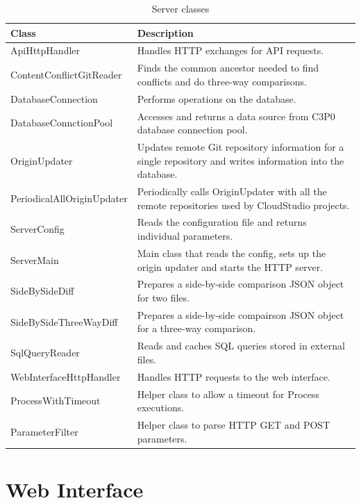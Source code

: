 \begin{table}

    \scriptsize
    \begin{tabularx}{\textwidth}{ | l | X | }
    \hline
\textbf{Class} & \textbf{Description} \\ \hline
ApiHttpHandler & Handles HTTP exchanges for API requests. \\ \hline
ContentConflictGitReader & Finds the common ancestor needed to find conflicts and do three-way comparisons. \\ \hline
DatabaseConnection & Performs operations on the database. \\ \hline
DatabaseConnctionPool & Accesses and returns a data source from C3P0 database connection pool. \\ \hline
OriginUpdater & Updates remote Git repository information for a single repository and writes information into the database. \\ \hline
PeriodicalAllOriginUpdater & Periodically calls OriginUpdater with all the remote repositories used by CloudStudio projects. \\ \hline
ServerConfig & Reads the configuration file and returns individual parameters. \\ \hline
ServerMain & Main class that reads the config, sets up the origin updater and starts the HTTP server. \\ \hline
SideBySideDiff & Prepares a side-by-side comparison JSON object for two files. \\ \hline
SideBySideThreeWayDiff & Prepares a side-by-side compairson JSON object for a three-way comparison. \\ \hline
SqlQueryReader & Reads and caches SQL queries stored in external files. \\ \hline
WebInterfaceHttpHandler & Handles HTTP requests to the web interface. \\ \hline
ProcessWithTimeout & Helper class to allow a timeout for Process executions. \\ \hline
ParameterFilter & Helper class to parse HTTP GET and POST parameters. \\ \hline
    \end{tabularx}
    
    \centering
  \caption{Server classes}
  \label{table:serverclasses}
\end{table}



\section{Web Interface}

